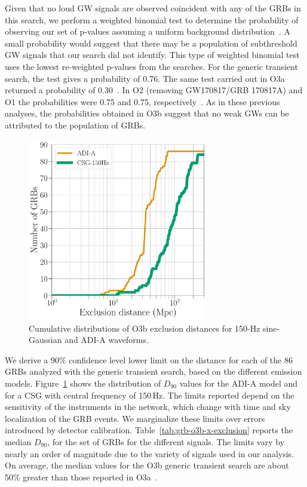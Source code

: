 Given that no loud \ac{GW} signals are observed coincident with any of the \acp{GRB} in this search, we perform a weighted binomial test to determine the probability of observing our set of p-values assuming a uniform background distribution~\citep{grb_s4, grb_s6}.
A small probability would suggest that there may be a population of subthreshold \ac{GW} signals that our search did not identify.
This type of weighted binomial test uses the lowest re-weighted p-values from the searches.
For the generic transient search, the test gives a probability of 0.76.
The same test carried out in O3a returned a probability of 0.30~\citep{grb_o3a}.
In O2 (removing GW170817/GRB 170817A) and O1 the probabilities were 0.75 and 0.75, respectively~\citep{grb_o2, grb_o1}.
As in these previous analyses, the probabilities obtained in O3b suggest that no weak GWs can be attributed to the population of GRBs.

\begin{figure}[h]
  \centering
  \includegraphics[width=0.7\textwidth]{figures/grb/o3b-x-exclusion.pdf}
  \caption{Cumulative distributions of O3b exclusion distances for 150-Hz sine-Gaussian and ADI-A waveforms.}
  \label{fig:grb-o3b-x-exclusion}
\end{figure}

We derive a 90\% confidence level lower limit on the distance for each of the 86 GRBs analyzed with the generic transient search, based on the different emission models.
Figure~\ref{fig:grb-o3b-x-exclusion} shows the distribution of $D_{90}$ values for the ADI-A model and for a CSG with central frequency of 150\,Hz.
The limits reported depend on the sensitivity of the instruments in the network, which change with time and sky localization of the GRB events.
We marginalize these limits over errors introduced by detector calibration.
Table~\ref{tab:grb-o3b-x-exclusion} reports the median $D_{90}$, for the set of GRBs for the different signals.
The limits vary by nearly an order of magnitude due to the variety of signals used in our analysis.
On average, the median values for the O3b generic transient search are about 50\% greater than those reported in O3a~\citep{grb_o3a}.

